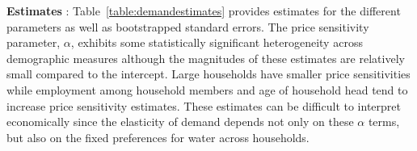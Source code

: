 \documentclass[12pt]{article}
\begin{document}
\textbf{Estimates} : Table~\ref{table:demandestimates} provides estimates for the different parameters as well as bootstrapped standard errors.  The price sensitivity parameter, $\alpha$, exhibits some statistically significant heterogeneity across demographic measures although the magnitudes of these estimates are relatively small compared to the intercept. Large households have smaller price sensitivities while employment among household members and age of household head tend to increase price sensitivity estimates.  These estimates can be difficult to interpret economically since the elasticity of demand depends not only on these $\alpha$ terms, but also on the fixed preferences for water across households.
\end{document}
